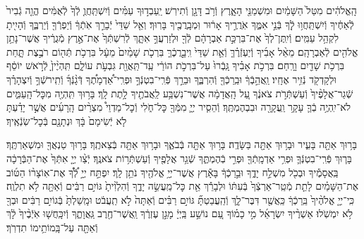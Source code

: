 \documentclass[twoside, openany, parskip=half, 11pt]{book}
\begin{document}
הָֽאֱלֹהִ֔ים מִטַּל֙ הַשָּׁמַ֔יִם וּמִשְׁמַנֵּ֖י הָאָ֑רֶץ וְֿרֹ֥ב דָּגָ֖ן וְֿתִירֽשׁ׃ יַֽעַבְד֣וּךָ עַמִּ֗ים וְֿיִשְׁתַּֽחֲוֻ֤ לְֿךָ֙ לְֿאֻמִּ֔ים הֱוֵ֤ה גְֿבִיר֙ לְֿאַחֶ֔יךָ וְֿיִשְׁתַּֽחֲו֥וּ לְֿ֖ךָ בְּֿנֵ֣י אִמֶּ֑ךָ אֹֽרֲרֶ֣יךָ אָר֔וּר וּֽמְבָֽרֲכֶ֖יךָ בָּרֽוּךְ׃ וְאֵ֤ל שַׁדַּי֙ יְֿבָרֵ֣ךְ אֹֽתְֿךָ֔ וְֿיַפְרְֿךָ֖ וְֿיַרְבֶּ֑ךָ וְֿהָיִ֖יתָ לִקְהַ֥ל עַמִּֽים׃ וְֿיִֽתֶּן־לְךָ֙ אֶת־בִּרְכַּ֣ת אַבְרָהָ֔ם לְֿךָ֖ וּלְזַרְעֲךָ֣ אִתָּ֑ךְ לְֿרִשְׁתְּֿךָ֙ אֶת־אֶ֣רֶץ מְֿגֻרֶ֔יךָ אֲשֶׁר־נָתַ֥ן אֱלֹהִ֖ים לְֿאַבְרָהָֽם׃ מֵאֵ֨ל אָבִ֜יךָ וְֿיַעְזְֿרֶ֗ךָּ וְֿאֵ֤ת שַׁדַּי֙ וִֽיבָ֣רֲכֶ֔ךָּ בִּרְכֹ֤ת שָׁמַ֨יִם֙ מֵעָ֔ל בִּרְכֹ֥ת תְּֿה֖וֹם רֹבֶ֣צֶת תָּ֑חַת בִּרְכֹ֥ת שָׁדַ֖יִם וָרָֽחַם׃ בִּרְכֹ֣ת אָבִ֗יךָ גָּֽבְֿרוּ֙ עַל־בִּרְכֹ֣ת הוֹרַ֔י עַֽד־תַּֽאֲוַ֖ת גִּבְעֹ֣ת עוֹלָ֑ם תִּֽהְיֶ֨יןָ֙ לְֿרֹ֣אשׁ יוֹסֵ֔ף וּלְקָדְקֹ֖ד נְֿזִ֥יר אֶחָֽיו׃
וַֽאֲהֵ֣בְֿךָ֔ וּבֵֽרַכְֿךָ֖ וְֿהִרְבֶּ֑ךָ וּבֵרַ֣ךְ פְּֿרִֽי־בִטְנְֿךָ֣ וּפְרִֽי־אַ֠דְמָתֶ֠ךָ דְּֿגָ֨נְֿךָ֜ וְֿתִֽירשְֿׁךָ֣ וְֿיִצְהָרֶ֗ךָ שְֿׁגַר־אֲלָפֶ֨יךָ֙ וְֿעַשְׁתְּֿרֹ֣ת צֹאנֶ֔ךָ עַ֚ל הָֽאֲדָמָ֔ה אֲשֶׁר־נִשְׁבַּ֥ע לַֽאֲבֹתֶ֖יךָ לָ֥תֶת לָֽךְ׃ בָּר֥וּךְ תִּֽהְיֶ֖ה מִכׇּל־הָֽעַמִּ֑ים לֹא־יִֽהְיֶ֥ה בְֿךָ֛ עָקָ֥ר וַֽעֲקָרָ֖ה וּבִבְהֶמְתֶּֽךָ׃ וְֿהֵסִ֧יר יְיָ֛ מִמְּֿךָ֖ כׇּל־חֹ֑לִי וְֿכׇל־מַדְוֵי֩ מִצְרַ֨יִם הָֽרָעִ֜ים אֲשֶׁ֣ר יָדַ֗עְתָּ לֹ֤א יְֿשִׂימָם֙ בָּ֔ךְ וּנְתָנָ֖ם בְּֿכׇל־שֽׂנְֿאֶֽיךָ׃

בָּר֥וּךְ אַתָּ֖ה בָּעִ֑יר וּבָר֥וּךְ אַתָּ֖ה בַּשָּׂדֶֽה׃ בָּר֥וּךְ אַתָּ֖ה בְּֿבֹאֶ֑ךָ וּבָר֥וּךְ אַתָּ֖ה בְּֿצֵאתֶֽךָ׃ בָּר֥וּךְ טַנְאֲךָ֖ וּמִשְׁאַרְתֶּֽךָ׃ בָּר֧וּךְ פְּֿרִֽי־בִטְנְֿךָ֛ וּפְרִ֥י אַדְמָֽתְֿךָ֖ וּפְרִ֣י בְֿהֶמְתֶּ֑ךָ שְֿׁגַ֥ר אֲלָפֶ֖יךָ וְֿעַשְׁתְּֿר֥וֹת צֹאנֶֽךָ׃ יְֿצַ֨ו יְיָ֤ אִתְּֿךָ֙ אֶת־הַבְּֿרָכָ֔ה בַּֽאֲסָמֶ֕יךָ וּבְכֹ֖ל מִשְׁלַ֣ח יָדֶ֑ךָ וּבֵ֣רַכְֿךָ֔ בָּאָ֕רֶץ אֲשֶׁר־יְיָ֥ אֱלֹהֶ֖יךָ נֹתֵ֥ן לָֽךְ׃ יִפְתַּ֣ח יְיָ֣ לְֿ֠ךָ֠ אֶת־אֽוֹצָר֨וֹ הַטּ֜וֹב אֶת־הַשָּׁמַ֗יִם לָתֵ֤ת מְֿטַֽר־אַרְצְֿךָ֙ בְּֿעִתּ֔וֹ וּלְבָרֵ֕ךְ אֵ֖ת כׇּל־מַֽעֲשֵׂ֣ה יָדֶ֑ךָ וְֿהִלְוִ֨יתָ֙ גּוֹיִ֣ם רַבִּ֔ים וְֿאַתָּ֖ה לֹ֥א תִלְוֶֽה׃ כִּֽי־יְיָ֤ אֱלֹהֶ֨יךָ֙ בֵּֽרַכְֿךָ֔ כַּֽאֲשֶׁ֖ר דִּבֶּר־לָ֑ךְ וְֿהַֽעֲבַטְתָּ֞ גּוֹיִ֣ם רַבִּ֗ים וְֿאַתָּה֙ לֹ֣א תַֽעֲבֹ֔ט וּמָֽשַׁלְתָּ֙ בְּֿגוֹיִ֣ם רַבִּ֔ים וּבְךָ֖ לֹ֥א יִמְשֹֽׁלוּ׃
אַשְׁרֶ֨יךָ יִשְׂרָאֵ֜ל מִ֣י כָמ֗וֹךָ עַ֚ם נוֹשַׁ֣ע בַּֽיְיָ֔ מָגֵ֣ן עֶזְרֶ֔ךָ וַֽאֲשֶׁר־חֶ֖רֶב גַּֽאֲוָתֶ֑ךָ וְֿיִכָּֽחֲשׁ֤וּ אֹֽיְֿבֶ֨יךָ֙ לָ֔ךְ וְֿאַתָּ֖ה עַל־בָּֽמוֹתֵ֥ימוֹ תִדְרֹֽךְ׃
\end{document}
